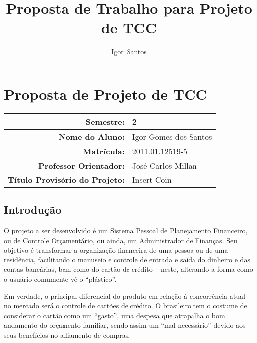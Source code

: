 \documentclass[a4paper]{abnt}
\author{Igor~Santos}
\title{Proposta de Trabalho para Projeto de TCC}
\begin{document}
\maketitle

\chapter{Proposta de Projeto de TCC}

\begin{center}
	\begin{tabular}{|r|l|}
		\hline
		\textbf{Semestre:} & 2 \\\hline
		\textbf{Nome do Aluno:} & Igor Gomes dos Santos \\\hline
		\textbf{Matrícula:} & 2011.01.12519-5 \\\hline
		\textbf{Professor Orientador:} & José Carlos Millan \\\hline
		\textbf{Título Provisório do Projeto:} & Insert Coin \\\hline
	\end{tabular}
\end{center}

\section{Introdução}

O projeto a ser desenvolvido é um Sistema Pessoal de Planejamento Financeiro, ou de Controle Orçamentário, ou ainda, um Administrador de
Finanças. Seu objetivo é transformar a organização financeira de uma pessoa ou de uma residência, facilitando o manuseio e controle de entrada e saída do dinheiro e das contas bancárias, bem como do cartão de crédito – neste, alterando a forma como o usuário comumente vê o ``plástico''.

Em verdade, o principal diferencial do produto em relação à concorrência atual no mercado será o controle de cartões de crédito. O brasileiro tem o costume de considerar o cartão como um ``gasto'', uma despesa que atrapalha o bom andamento do orçamento familiar, sendo assim um ``mal necessário'' devido aos seus benefícios no adiamento de compras.
\end{document}
